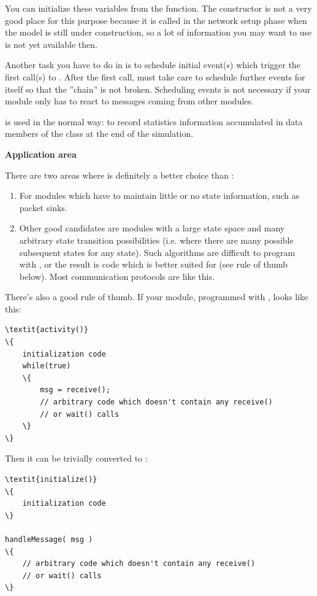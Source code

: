 You can initialize these variables from the 
function.  The constructor is not a very good place
for this purpose because it is called in the network setup phase when
the model is still under construction, so a lot of information you may
want to use is not yet available then.


Another task you have to do in  is to schedule
initial event(s) which trigger the first call(s)
to .  After the first call,
 must take care to schedule further events for
itself so that the ''chain'' is not broken. Scheduling events is not
necessary if your module only has to react to messages coming from
other modules.


 is used in the normal way: to record statistics information 
accumulated in data members of the class at the end of the simulation.


\textbf{Application area}


There are two areas where  is definitely a better 
choice than :
\begin{enumerate}
\item{For modules which have to maintain little or no state information, 
    such as packet sinks.}
\item{Other good candidates are modules with a large state space and 
    many arbitrary state transition possibilities (i.e. where there 
    are many possible subsequent states for any state). Such algorithms 
    are difficult to program with , or the result is code 
    which is better suited for  (see rule of thumb 
    below). Most communication protocols are like this.}
\end{enumerate}

There's also a good rule of thumb. If your module, programmed 
with , looks like this:

\begin{Verbatim}[commandchars=\\\{\}]
\textit{activity()}
\{
    initialization code
    while(true)
    \{
        msg = receive();
        // arbitrary code which doesn't contain any receive()
        // or wait() calls
    \}
\}
\end{Verbatim}

Then it can be trivially converted to :

\begin{Verbatim}[commandchars=\\\{\}]
\textit{initialize()}
\{
    initialization code
\}

handleMessage( msg )
\{
    // arbitrary code which doesn't contain any receive()
    // or wait() calls
\}
\end{Verbatim}
  


